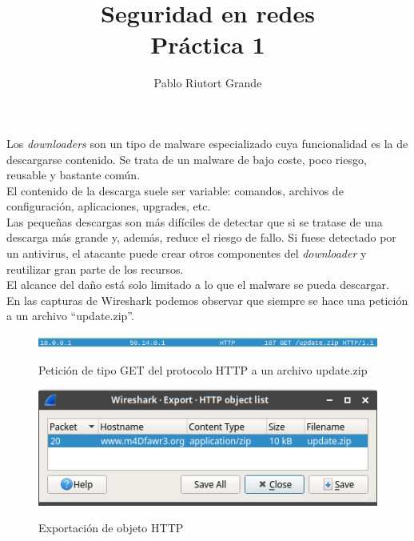 \documentclass[10pt,a4paper]{article}
\author{Pablo Riutort Grande}
\title{Seguridad en redes\\ \vspace{1cm}\textbf{Práctica 1}}
\begin{document}
\maketitle
\pagebreak
\section{}
\subsection{}
Los \textit{downloaders} son un tipo de malware especializado cuya funcionalidad es la de descargarse contenido. Se trata de un malware de bajo coste, poco riesgo, reusable y bastante común.\\
El contenido de la descarga suele ser variable: comandos, archivos de configuración, aplicaciones, upgrades, etc. \\
Las pequeñas descargas son más difíciles de detectar que si se tratase de una descarga más grande y, además, reduce el riesgo de fallo. Si fuese detectado por un antivirus, el atacante puede crear otros componentes del \textit{downloader} y reutilizar gran parte de los recursos. \\
El alcance del daño está solo limitado a lo que el malware se pueda descargar.\\

En las capturas de Wireshark podemos observar que siempre se hace una petición a un archivo ``update.zip''.

\begin{figure}[h!]
  \centering
  \includegraphics[scale=0.6]{1_1.png}\\
  \caption{Petición de tipo GET del protocolo HTTP a un archivo update.zip}
  \label{fig:get}
\end{figure}

\begin{figure}[h!]
  \centering
  \includegraphics[scale=0.6]{1_1_2.png}\\
  \caption{Exportación de objeto HTTP}
  \label{fig:object}
\end{figure}
\end{document}

